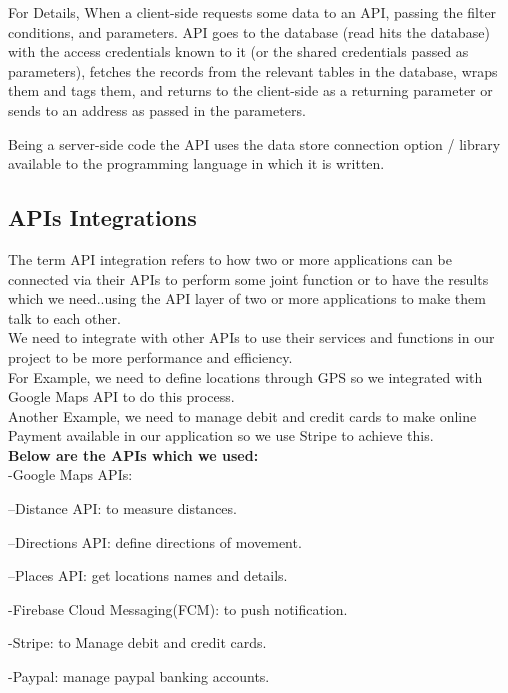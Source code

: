  For Details, When a client-side  requests some data to an API, passing the filter conditions, and parameters. API goes to the database (read hits the database) with the access credentials known to it (or the shared credentials passed as parameters), fetches the records from the relevant tables in the database, wraps them and tags them, and returns to the client-side as a returning parameter or sends to an address as passed in the parameters.
 
Being a server-side code the API uses the data store connection option / library available to the programming language in which it is written.


\subsection{APIs Integrations}

\hspace{2cm}The term API integration refers to how two or more applications can be connected via their APIs to perform some joint function or to have the results which we need..using the API layer of two or more applications to make them talk to each other.\\
We need to integrate with other APIs to use their services and functions in our project to be more performance and efficiency.\\
For Example, we need to define locations through GPS so we integrated with Google Maps API to do this process.\\
Another Example, we need to manage debit and credit cards to make online Payment available in our application so we use Stripe to achieve this.\\

\textbf{Below are the  APIs which we used:}\\
-Google Maps APIs:

\hspace{1cm}--Distance API: to measure distances.

\hspace{1cm}--Directions API: define directions of movement.

\hspace{1cm}--Places API: get locations names and details.

-Firebase Cloud Messaging(FCM): to push notification.

-Stripe: to Manage debit and credit cards.

-Paypal: manage paypal banking accounts.

